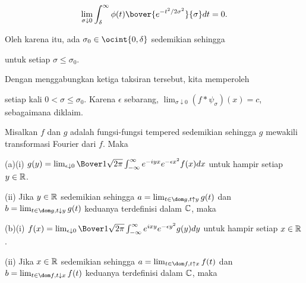 {$$\lim_{\sigma\downarrow 0}\int_{\delta}^{\infty}
   \phi(t)\bover{e^{-t^2/2\sigma^2}}{\sigma}dt=0.$$

\noindent Oleh karena itu, ada $\sigma_0\in\ocint{0,\delta}$ sedemikian
sehingga

\Centerline{$\int_{\delta}^{\infty}\phi\times\psi_{\sigma} \le\epsilon$}

\noindent untuk setiap $\sigma\le \sigma_0$.

\medskip

 Dengan menggabungkan ketiga taksiran tersebut, kita memperoleh


\noindent setiap kali $0<\sigma\le\sigma_0$. Karena $\epsilon$ sebarang,
$\lim_{\sigma\downarrow 0}(f*\psi_{\sigma})(x)=c$, sebagaimana diklaim. }%

 Misalkan $f$ dan $g$ adalah fungsi-fungsi
tempered sedemikian sehingga $g$ mewakili transformasi Fourier dari $f$. Maka

(a)(i) $g(y) =\lim_{\epsilon\downarrow
0}\Bover1{\sqrt{2\pi}}\int_{-\infty}^{\infty} e^{-iyx}e^{-\epsilon x^2}f(x)dx$
untuk hampir setiap $y\in\Bbb R$.

\quad(ii) Jika $y\in\Bbb R$ sedemikian sehingga $a=\lim_{t\in\dom
g,t\uparrow y}g(t)$ dan $b=\lim_{t\in\dom g,t\downarrow y}g(t)$ keduanya
terdefinisi dalam $\Bbb C$, maka


(b)(i) $f(x) =\lim_{\epsilon\downarrow
0}\Bover1{\sqrt{2\pi}}\int_{-\infty}^{\infty} e^{ixy}e^{-\epsilon y^2}g(y)dy$
untuk hampir setiap $x\in\Bbb R$.

\quad(ii) Jika $x\in\Bbb R$ sedemikian sehingga $a=\lim_{t\in\dom
f,t\uparrow x}f(t)$ dan $b=\lim_{t\in\dom f,t\downarrow x}f(t)$ keduanya
terdefinisi dalam $\Bbb C$, maka


